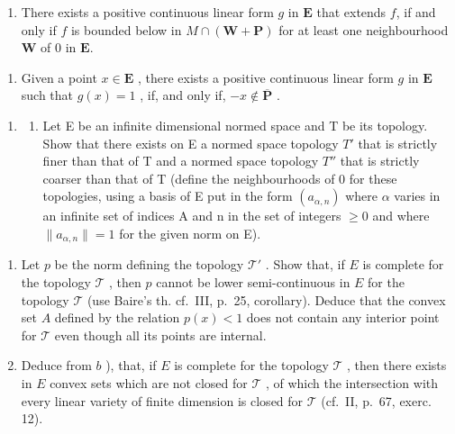 \begin{enumerate}
\def\labelenumi{\alph{enumi})}
\item
  There exists a positive continuous linear form \(g\) in \(\mathbf{E}\) that extends \(f\), if and only if \(f\) is bounded below in \(M \cap (\mathbf{W} + \mathbf{P})\) for at least one neighbourhood \(\mathbf{W}\) of 0 in \(\mathbf{E}\).
\end{enumerate}

\begin{enumerate}
\def\labelenumi{\alph{enumi})}
\setcounter{enumi}{1}
\tightlist
\item
  Given a point \(x \in \mathbf{E}\) , there exists a positive continuous linear form \(g\) in \(\mathbf{E}\) such that \(g(x) = 1\) , if, and only if, \(-x \notin \overline{\mathbf{P}}\) .
\end{enumerate}

\begin{enumerate}
\def\labelenumi{\arabic{enumi})}
\setcounter{enumi}{4}
\tightlist
\item
  \begin{enumerate}
  \def\labelenumii{\alph{enumii})}
  \tightlist
  \item
    Let E be an infinite dimensional normed space and T be its topology. Show that there exists on E a normed space topology \(T'\) that is strictly finer than that of T and a normed space topology \(T''\) that is strictly coarser than that of T (define the neighbourhoods of 0 for these topologies, using a basis of E put in the form \((a_{\alpha,n})\) where \(\alpha\) varies in an infinite set of indices A and n in the set of integers \(\geqslant 0\) and where \(\|a_{\alpha,n}\| = 1\) for the given norm on E).
  \end{enumerate}
\end{enumerate}

\begin{enumerate}
\def\labelenumi{\alph{enumi})}
\setcounter{enumi}{1}
\item
  Let \(p\) be the norm defining the topology \(\mathcal{T}'\) . Show that, if \(E\) is complete for the topology \(\mathcal{T}\) , then \(p\) cannot be lower semi-continuous in \(E\) for the topology \(\mathcal{T}\) (use Baire's th. cf.~III, p.~25, corollary). Deduce that the convex set \(A\) defined by the relation \(p(x) < 1\) does not contain any interior point for \(\mathcal{T}\) even though all its points are internal.
\item
  Deduce from \(b\) ), that, if \(E\) is complete for the topology \(\mathcal{T}\) , then there exists in \(E\) convex sets which are not closed for \(\mathcal{T}\) , of which the intersection with every linear variety of finite dimension is closed for \(\mathcal{T}\) (cf.~II, p.~67, exerc. 12).
\end{enumerate}

